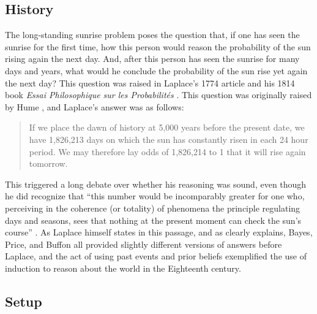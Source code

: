 \documentclass[a4paper, 12pt]{article}
\theoremstyle{plain}
\theoremstyle{definition}
\theoremstyle{remark}
\begin{document}
\subsection{History}

The long-standing sunrise problem poses the question that, if one has seen the sunrise for the first time, how this person would reason the probability of the sun rising again the next day. And, after this person has seen the sunrise for many days and years, what would he conclude the probability of the sun rise yet again the next day? This question was raised in Laplace's 1774 article \citep{stigler.laplace} and his 1814 book \textit{Essai Philosophique sur les Probabilit\'es} \citep{laplace.essai}. This question was originally raised by Hume \citep[e.g.,][p.~173]{zabell.attribution}, and Laplace's answer \citep[][p.11]{laplace.essai} was as follows:
\begin{quote}
If we place the dawn of history at 5,000 years before the present date, we have 1,826,213 days on which the sun has constantly risen in each 24 hour period. We may therefore lay odds of 1,826,214 to 1 that it will rise again tomorrow.
\end{quote}
This triggered a long debate over whether his reasoning was sound, even though he did recognize that ``this number would be incomparably greater for one who, perceiving in the coherence (or totality) of phenomena the principle regulating days and seasons, sees that nothing at the present moment can check the sun's course'' \citep[][p.~11]{laplace.essai}. As Laplace himself states in this passage, and as \citet{zabell.attribution} clearly explains, Bayes, Price, and Buffon all provided slightly different versions of answers before Laplace, and the act of using past events and prior beliefs exemplified the use of induction to reason about the world in the Eighteenth century. 

\subsection{Setup}
\end{document}
